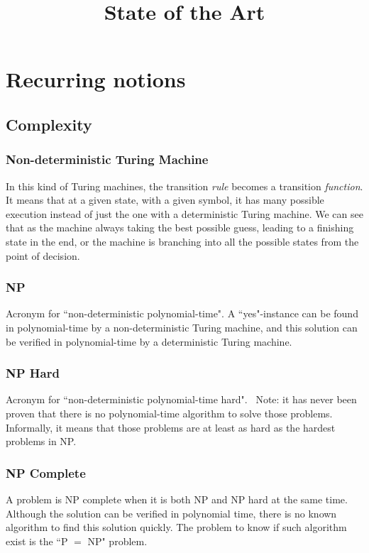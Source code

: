 \documentclass[12pt,a4paper]{article}
\title{State of the Art}
\begin{document}
\maketitle

\section{Recurring notions}
\subsection{Complexity}


\subsubsection{Non-deterministic Turing Machine}
In this kind of Turing machines, the transition \textit{rule} becomes a transition \textit{function}.
It means that at a given state, with a given symbol, it has many possible execution instead of just the one with a deterministic Turing machine.
We can see that as the machine always taking the best possible guess, leading to a finishing state in the end, or the machine is branching into all the possible states from the point of decision.

\subsubsection{NP}
Acronym for ``non-deterministic polynomial-time".
A ``yes"-instance can be found in polynomial-time by a non-deterministic Turing machine, and this solution can be verified in polynomial-time by a deterministic Turing machine.


\subsubsection{NP Hard}
Acronym for ``non-deterministic polynomial-time hard".
~\newline{}\noindent Note: it has never been proven that there is no polynomial-time algorithm to solve those problems.
Informally, it means that those problems are at least as hard as the hardest problems in NP.

\subsubsection{NP Complete}
A problem is NP complete when it is both NP and NP hard at the same time.
Although the solution can be verified in polynomial time, there is no known algorithm to find this solution quickly.
The problem to know if such algorithm exist is the ``P $=$ NP" problem.
\end{document}
